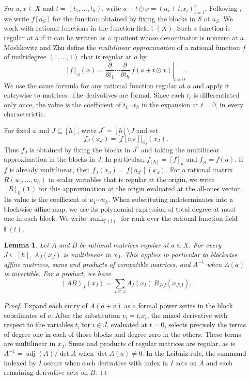 \documentclass[11pt,reqno]{amsart}
\theoremstyle{plain}
\newtheorem{lemma}[theorem]{Lemma}
\theoremstyle{definition}
\newcommand{\F}{\mathbb F}
\DeclareMathOperator{\rk}{rank}
\begin{document}
For $a,x\in X$ and $t=(t_1,\ldots,t_h)$, write $a+t\odot x=(a_i+t_i x_i)_{i=1}^h$.
Following \cite[\S2.1]{MZSchur}, we write $f[a_S]$ for the function
obtained by fixing the blocks in $S$ at $a_S$. We work with rational functions
in the function field $\F(X)$. Such a function is regular at
$a$ if it can be written as a quotient whose denominator is nonzero at $a$.
Moshkovitz and Zhu \cite[Definition~3.1]{MZSchur} define the
\emph{multilinear approximation} of a rational function $f$ of multidegree
$(1,\ldots,1)$ that is regular at $a$ by
\[
 [f]_a(x)=
 \left.\frac{\partial}{\partial t_1}\cdots
       \frac{\partial}{\partial t_h}\,f(a+t\odot x)\right|_{t=0}.
\]
We use the same formula for any rational function regular at $a$ and
apply it entrywise to matrices. The derivatives are formal. Since each
$t_i$ is differentiated only once, the value is the coefficient of
$t_1\cdots t_h$ in the expansion at $t=0$, in every characteristic.

For fixed $a$ and $J\subseteq[h]$, write $J^c=[h]\setminus J$ and set
\[
 f_J(x_J)=\bigl[f[a_{J^c}]\bigr]_{a_J}(x_J).
\]
Thus $f_J$ is obtained by fixing the blocks in $J^c$ and taking the
multilinear approximation in the blocks in $J$. In particular,
$f_{[h]}=[f]_a$ and $f_\varnothing=f(a)$. If $f$ is already
multilinear, then $f_J(x_J)=f[a_{J^c}](x_J)$.
For a rational matrix $R(u_1,\ldots,u_h)$ in scalar variables that is regular at the origin, we
write $[R]_0(\mathbf 1)$ for this approximation at the origin evaluated
at the all-ones vector. Its value is the coefficient of $u_1\cdots u_h$.
When substituting indeterminates into a blockwise affine map, we use
its polynomial expression of total degree at most one in each block.
We write $\rk_{\F(t)}$ for rank over the rational function field $\F(t)$.

\begin{lemma}\label{lem:coefficient rule}
Let $A$ and $B$ be rational matrices regular at $a\in X$. For every
$J\subseteq[h]$, $A_J(x_J)$ is multilinear in $x_J$. This applies
in particular to blockwise affine matrices, sums and products of
compatible matrices, and $A^{-1}$ when $A(a)$ is invertible.
For a product, we have
\[
 (AB)_J(x_J)=\sum_{I\subseteq J} A_I(x_I)\,B_{J\setminus I}(x_{J\setminus I}).
\]
\end{lemma}
\begin{proof}
Expand each entry of $A(a+v)$ as a formal power series in the block
coordinates of $v$. After the substitution $v_i=t_ix_i$, the mixed
derivative with respect to the variables $t_i$ for $i\in J$, evaluated at $t=0$, selects precisely
the terms of degree one in each of those blocks and degree zero in the others.
These terms are multilinear in $x_J$. Sums and products of regular matrices
are regular, as is $A^{-1}=\operatorname{adj}(A)/\det A$ when
$\det A(a)\ne0$. In the Leibniz rule, the summand indexed by $I$ occurs when
each derivative with index in $I$ acts on $A$ and each remaining
derivative acts on $B$.
\end{proof}
\end{document}
